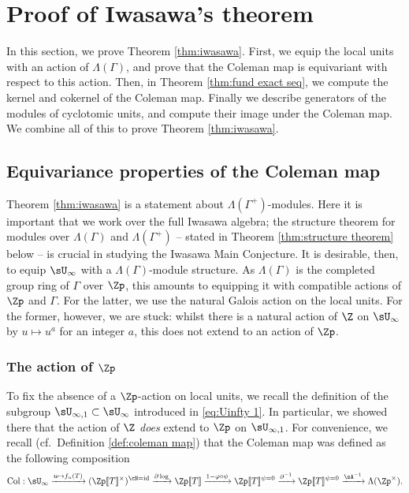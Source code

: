 \documentclass[a4paper,10pt, english, reqno]{smfart}
\newcommand{\lsem}{[\! [}
\newcommand{\rsem}{]\! ]}
\newcommand{\GG}{\Gamma}
\numberwithin{equation}{section}
\begin{document}


\section{Proof of Iwasawa's theorem}\label{sec:proof Iwasawa}

In this section, we prove Theorem \ref{thm:iwasawa}. First, we equip the local units with an action of $\Lambda(\GG)$, and prove that the Coleman map is equivariant with respect to this action. Then, in Theorem \ref{thm:fund exact seq}, we compute the kernel and cokernel of the Coleman map. Finally we describe generators of the modules of cyclotomic units, and compute their image under the Coleman map. We combine all of this to prove Theorem \ref{thm:iwasawa}.

\subsection{Equivariance properties of the Coleman map}\label{sec:equivariance}

Theorem \ref{thm:iwasawa} is a statement about $\Lambda(\GG^+)$-modules. Here it is important that we work over the full Iwasawa algebra; the structure theorem for modules over $\Lambda(\GG)$ and $\Lambda(\GG^+)$ -- stated in Theorem \ref{thm:structure theorem} below -- is crucial in studying the Iwasawa Main Conjecture. It is desirable, then, to equip $\sU_\infty$ with a $\Lambda(\GG)$-module structure. As $\Lambda(\GG)$ is the completed group ring of $\GG$ over $\Zp$, this amounts to equipping it with compatible actions of $\Zp$ and $\GG$. For the latter, we use the natural Galois action on the local units. For the former, however, we are stuck: whilst there is a natural action of $\Z$ on $\sU_\infty$ by $u \mapsto u^a$ for an integer $a$, this does not extend to an action of $\Zp$. 


\subsubsection{The action of $\Zp$}

To fix the absence of a $\Zp$-action on local units, we recall the definition of the subgroup $\sU_{\infty,1} \subset \sU_\infty$ introduced in \eqref{eq:Uinfty 1}. In particular, we showed there that the action of $\Z$ \emph{does} extend to $\Zp$ on $\sU_{\infty,1}$. %
For convenience, we recall (cf.\ Definition \ref{def:coleman map}) that the Coleman map was defined as the following composition
\[
\mathrm{Col} :	\sU_\infty \xrightarrow{u \mapsto f_u(T)} (\Zp\lsem T\rsem ^\times)^{\cN=\mathrm{id}} \xrightarrow {\partial\log} \Zp\lsem T\rsem  \xrightarrow{1-\varphi\circ\psi} \Zp\lsem T\rsem ^{\psi = 0}\xrightarrow{\partial^{-1}}\Zp\lsem T\rsem ^{\psi = 0} \xrightarrow{\sA^{-1}} \Lambda(\Zp^\times).
\]
\end{document}
